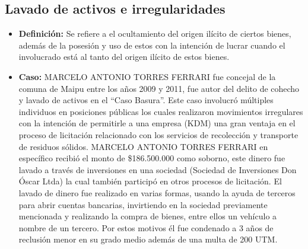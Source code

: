 \documentclass[letter,12pt]{article}
\begin{document}
		\subsection*{Lavado de activos e irregularidades}
			\begin{itemize}
				\item \textbf{Definición:} Se refiere a el ocultamiento del origen ilícito de ciertos bienes, además de la posesión y uso de estos con la intención de lucrar cuando el involucrado está al tanto del origen ilícito de estos bienes.
			
				\item \textbf{Caso:} MARCELO ANTONIO TORRES FERRARI fue concejal de la comuna de Maipu entre los años 2009 y 2011, fue autor del delito de cohecho y lavado de activos en el “Caso Basura”. Este caso involucró múltiples individuos en posiciones públicas los cuales realizaron movimientos irregulares con la intención de permitirle a una empresa (KDM) una gran ventaja en el proceso de licitación relacionado con los servicios de recolección y transporte de residuos sólidos. MARCELO ANTONIO TORRES FERRARI en específico recibió el monto de \$186.500.000 como soborno, este dinero fue lavado a través de inversiones en una sociedad (Sociedad de Inversiones Don Óscar Ltda) la cual también participó en otros procesos de licitación. El lavado de dinero fue realizado en varias formas, usando la ayuda de terceros para abrir cuentas bancarias, invirtiendo en la sociedad previamente mencionada y realizando la compra de bienes, entre ellos un vehículo a nombre de un tercero. Por estos motivos él fue condenado a 3 años de reclusión menor en su grado medio además de una multa de 200 UTM.
			\end{itemize}
		
			
\end{document}
